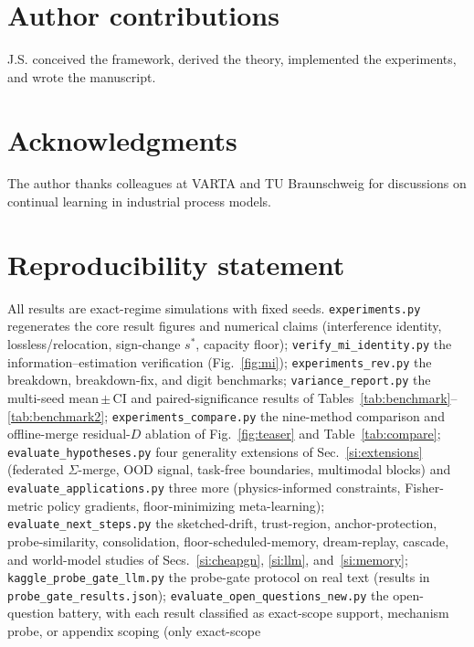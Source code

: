 \documentclass[10pt,a4paper]{article}
\theoremstyle{plain}
\theoremstyle{definition}
\newcommand{\Sig}{\Sigma}
\newcommand{\sstar}{s^{\ast}}
\begin{document}
\section*{Author contributions}
J.S. conceived the framework, derived the theory, implemented the experiments, and wrote the
manuscript.

\section*{Acknowledgments}
The author thanks colleagues at VARTA and TU Braunschweig for discussions on continual learning
in industrial process models.

\section*{Reproducibility statement}
\sloppy
All results are exact-regime simulations with fixed seeds. \texttt{experiments.py} regenerates
the core result figures and numerical claims (interference identity, lossless/relocation,
sign-change $\sstar$, capacity floor); \texttt{verify\_mi\_identity.py} the
information--estimation verification (Fig.~\ref{fig:mi}); \texttt{experiments\_rev.py} the
breakdown, breakdown-fix, and digit benchmarks; \texttt{variance\_report.py} the multi-seed
mean\,$\pm$\,CI and paired-significance results of Tables~\ref{tab:benchmark}--\ref{tab:benchmark2};
\texttt{experiments\_compare.py} the nine-method comparison and offline-merge residual-$D$
ablation of Fig.~\ref{fig:teaser} and Table~\ref{tab:compare};
\texttt{evaluate\_hypotheses.py} four generality extensions of Sec.~\ref{si:extensions}
(federated $\Sig$-merge, OOD signal, task-free boundaries, multimodal blocks) and
\texttt{evaluate\_applications.py} three more (physics-informed constraints, Fisher-metric
policy gradients, floor-minimizing meta-learning);
\texttt{evaluate\_next\_steps.py} the sketched-drift, trust-region, anchor-protection,
probe-similarity, consolidation, floor-scheduled-memory, dream-replay, cascade, and
world-model studies of Secs.~\ref{si:cheapgn}, \ref{si:llm}, and~\ref{si:memory};
\texttt{kaggle\_probe\_gate\_llm.py} the probe-gate protocol on real text (results in
\texttt{probe\_gate\_results.json});
\texttt{evaluate\_open\_questions\_new.py} the open-question battery, with each result
classified as exact-scope support, mechanism probe, or appendix scoping (only exact-scope
\end{document}
